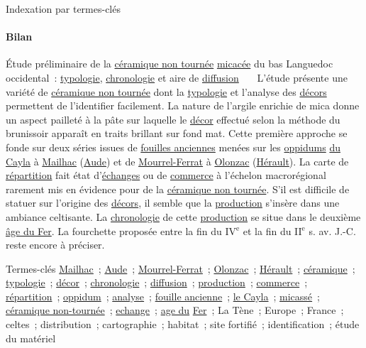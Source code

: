   \begin{frame}{Indexation par termes-clés}\framesubtitle{Bilan}
    \vspace{-.33em}
    \begin{exampleblock}{\small
      Étude préliminaire de la \underline{céramique non tournée}
      \underline{micacée} du bas Languedoc occidental~: \underline{typologie},
      \underline{chronologie} et aire de \underline{diffusion}
    }\justifying\small
      ~~~L'étude présente une variété de \underline{céramique non tournée} dont la
      \underline{typologie} et l'analyse des \underline{décors} permettent de
      l'identifier facilement. La nature de l'argile enrichie de mica donne un
      aspect pailleté à la pâte sur laquelle le \underline{décor} effectué selon
      la méthode du brunissoir apparaît en traits brillant sur fond mat. Cette
      première approche se fonde sur deux séries issues de \underline{fouilles
      anciennes} menées sur les \underline{oppidums} \underline{du Cayla} à
      \underline{Mailhac} (\underline{Aude}) et de \underline{Mourrel-Ferrat} à
      \underline{Olonzac} (\underline{Hérault}). La carte de
      \underline{répartition} fait état d'\underline{échanges} ou de
      \underline{commerce} à l'échelon macrorégional rarement mis en évidence pour
      de la \underline{céramique non tournée}. S'il est difficile de statuer sur
      l'origine des \underline{décors}, il semble que la \underline{production}
      s'insère dans une ambiance celtisante. La \underline{chronologie} de cette
      \underline{production} se situe dans le deuxième \underline{âge du Fer}. La
      fourchette proposée entre la fin du IV$^\text{e}$ et la fin du II$^\text{e}$
      s. av. J.-C. reste encore à préciser.

      \begin{exampleblock}{\small Termes-clés}\justifying\small
        \underline{Mailhac}~; \underline{Aude}~; \underline{Mourrel-Ferrat}~;
        \underline{Olonzac}~; \underline{Hérault}~; \underline{céramique}~;
        \underline{typologie}~; \underline{décor}~; \underline{chronologie}~;
        \underline{diffusion}~; \underline{production}~; \underline{commerce}~;
        \underline{répartition}~; \underline{oppidum}~; \underline{analyse}~;
        \underline{fouille ancienne}~; \underline{le Cayla}~;
        \underline{micassé}~; \underline{céramique non-tournée}~;
        \underline{echange}~; \underline{age du} \underline{Fer}~; La Tène~;
        Europe~; France~; celtes~; distribution~; cartographie~; habitat~; site
        fortifié~; identification~; étude du matériel
      \end{exampleblock}
    \end{exampleblock}
  \end{frame}
